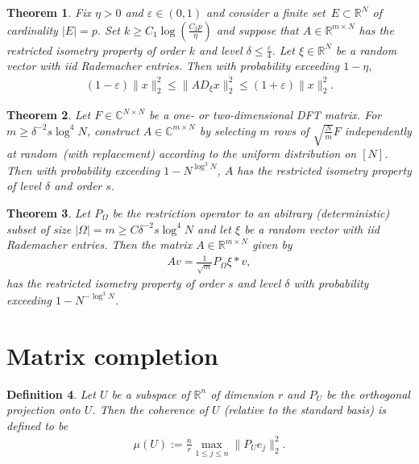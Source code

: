 \documentclass[13pt]{article}
\newtheorem{thm}{Theorem}[section]
\theoremstyle{plain}
\newtheorem{defi}[thm]{Definition}
\newcommand{\R}{\mathbb{R}}
\newcommand{\C}{\mathbb{C}}
\begin{document}
\begin{thm}
    Fix $\eta > 0$ and $\varepsilon \in (0,1)$ and consider a finite set $E \subset \R^N$ of
    cardinality $|E| = p$. Set $k \ge C_1 \log\left( \frac{C_2p}{\eta} \right)$ and suppose
    that $A \in \R^{m \times N}$ has the restricted isometry property of order $k$ and level
    $\delta \le \frac{\varepsilon}{4}$. Let $\xi \in \R^N$ be a random vector with iid
    Rademacher entries. Then with probability exceeding $1 - \eta$,
    \[
        \begin{aligned}
            (1-\varepsilon)\|x\|_2^2 \le \|AD_{\xi} x\|_2^2 \le (1+\varepsilon)\|x\|_2^2.
        \end{aligned}
    \]
\end{thm} 

\begin{thm}
    Let $F \in \C^{N \times N}$ be a one- or two-dimensional DFT matrix.
    For $m \ge \delta^{-2} s \log^4 N$, construct $A \in \C^{m \times N}$ by selecting
    $m$ rows of $\sqrt{\frac{N}{m}} F$ independently at random (with replacement)
    according to the uniform distribution on $[N]$.
    Then with probability exceeding $1 - N^{\log^3 N}$, $A$ has the
    restricted isometry property of level $\delta$ and order $s$.
\end{thm}

\begin{thm}
    Let $P_\Omega$ be the restriction operator to an abitrary (deterministic) subset
    of size $|\Omega| = m \ge C \delta^{-2} s\log^4 N$ and let
    $\xi$ be a random vector with iid Rademacher entries. Then the matrix $A \in \R^{m \times N}$ 
    given by
    \[
        \begin{aligned}
            Av = \frac{1}{\sqrt{m}} P_{\Omega} \xi \ast v,
        \end{aligned}
    \]
    has the restricted isometry property of order $s$ and level $\delta$
    with probability exceeding $1 - N^{-\log^3 N}$.
\end{thm}

\newpage

\section{Matrix completion}

\begin{defi}
    Let $U$ be a subspace of $\R^n$ of dimension $r$ and $P_U$ be the orthogonal projection onto
    $U$. Then the \emph{coherence} of $U$ (relative to the standard basis) is defined to be
    \[
        \begin{aligned}
            \mu(U) := \frac{n}{r} \max_{1 \le j \le n} \|P_U e_j\|_2^2.
        \end{aligned}
    \]
\end{defi}
\end{document}
